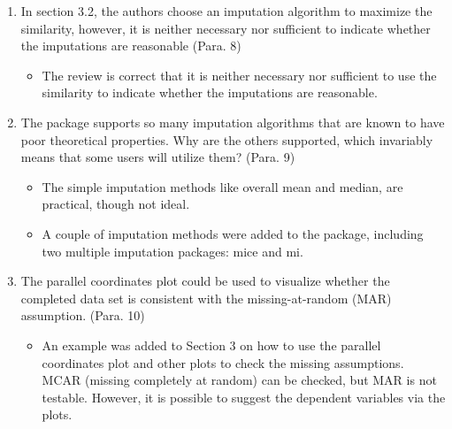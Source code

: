 \documentclass[12pt,english]{article}
\begin{document}
\begin{enumerate}
\item In section 3.2, the authors choose an imputation algorithm to maximize
the similarity, however, it is neither necessary nor sufficient to
indicate whether the imputations are reasonable (Para. 8)
\begin{itemize}
\item The review is correct that it is neither necessary nor sufficient
to use the similarity to indicate whether the imputations are reasonable.
\end{itemize}

\item The package supports so many imputation algorithms that are known
to have poor theoretical properties. Why are the others supported,
which invariably means that some users will utilize them? (Para. 9)
\begin{itemize}
\item The simple imputation methods like overall mean and median, are practical,
though not ideal.
\item A couple of imputation methods were added to the package, including
two multiple imputation packages: mice and mi.
\end{itemize}

\item The parallel coordinates plot could be used to visualize whether the
completed data set is consistent with the missing-at-random (MAR)
assumption. (Para. 10)
\begin{itemize}
\item An example was added to Section 3 on how to use the parallel coordinates
plot and other plots to check the missing assumptions. MCAR (missing
completely at random) can be checked, but MAR is not testable. However,
it is possible to suggest the dependent variables via the plots.
\end{itemize}

\end{enumerate}
\end{document}
